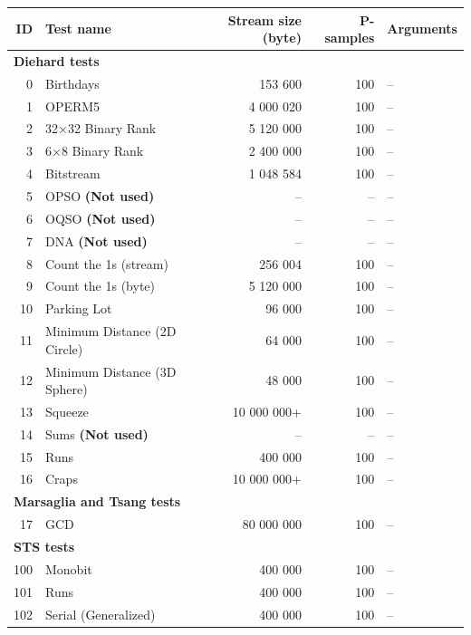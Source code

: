 \documentclass[
  digital,  	%
  color,		%
  oneside,   	%
  12pt,
  nocover,
  notable,
  nolof,
  nolot,
]{fithesis3}
\theoremstyle{definition}
\theoremstyle{remark}
\begin{document}
\begin{nomar}
\centering
\begin{tabular}{r | l | r | r | l}
\textbf{ID} & \textbf{Test name} & \textbf{Stream size (byte)} & \textbf{P-samples} & \textbf{Arguments} \\ \hline \hline
\multicolumn{5}{l}{\textbf{Diehard tests}} \\
0   & Birthdays                    &    153 600 & 100 & -- \\
1   & OPERM5                       &  4 000 020 & 100 & -- \\
2   & 32$\times$32 Binary Rank     &  5 120 000 & 100 & -- \\
3   & 6$\times$8 Binary Rank       &  2 400 000 & 100 & -- \\
4   & Bitstream                    &  1 048 584 & 100 & -- \\
5   & OPSO \textbf{(Not used)}     &         -- & --  & -- \\
6   & OQSO \textbf{(Not used)}     &         -- & --  & -- \\
7   & DNA \textbf{(Not used)}      &         -- & --  & -- \\
8   & Count the 1s (stream)        &    256 004 & 100 & -- \\
9   & Count the 1s (byte)          &  5 120 000 & 100 & -- \\
10  & Parking Lot                  &     96 000 & 100 & -- \\
11  & Minimum Distance (2D Circle) &     64 000 & 100 & -- \\
12  & Minimum Distance (3D Sphere) &     48 000 & 100 & -- \\
13  & Squeeze 					   & 10 000 000+& 100 & -- \\
14  & Sums \textbf{(Not used)}     &         -- & --  & -- \\
15  & Runs                         &    400 000 & 100 & -- \\
16  & Craps                        & 10 000 000+& 100 & -- \\ \hline
\multicolumn{5}{l}{\textbf{Marsaglia and Tsang tests}} \\ 
17  & GCD & 80 000 000 & 100 & -- \\ \hline
\multicolumn{5}{l}{\textbf{STS tests}} \\ 
100 & Monobit              & 400 000 & 100 & -- \\
101 & Runs                 & 400 000 & 100 & -- \\
102 & Serial (Generalized) & 400 000 & 100 & -- \\ \hline

\end{tabular}
\end{nomar}
\end{document}
